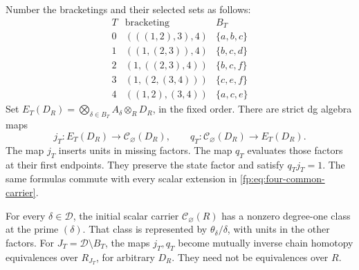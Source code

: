 Number the bracketings and their selected sets as follows:
\begin{equation}\label{fp:eq:four-tree-sets}
\begin{array}{c|c|c}
 T&\text{bracketing}&B_T\\\hline
 0&(((1,2),3),4)&\{a,b,c\}\\
 1&((1,(2,3)),4)&\{b,c,d\}\\
 2&(1,((2,3),4))&\{b,c,f\}\\
 3&(1,(2,(3,4)))&\{c,e,f\}\\
 4&((1,2),(3,4))&\{a,c,e\}
\end{array}
\end{equation}
Set \(E_T(D_R)=\bigotimes_{\delta\in B_T}A_\delta
\otimes_R D_R\), in the fixed order.
There are strict dg algebra maps
\[
 j_T:E_T(D_R)\longrightarrow\mathcal C_\varnothing(D_R),
 \qquad
 q_T:\mathcal C_\varnothing(D_R)\longrightarrow E_T(D_R).
\]
The map \(j_T\) inserts units in missing factors.  The map
\(q_T\) evaluates those factors at their first endpoints.
They preserve the state factor and satisfy \(q_Tj_T=1\).
The same formulas commute with every scalar extension in
\eqref{fp:eq:four-common-carrier}.

\begin{proposition}
\label{fp:prop:four-full-carrier}
For every \(\delta\in\mathcal D\), the initial scalar carrier
\(\mathcal C_\varnothing(R)\) has a nonzero degree-one class
at the prime \((\delta)\).  That class is represented by
\(\theta_\delta/\delta\), with units in the other factors.
For \(J_T=\mathcal D\setminus B_T\), the maps \(j_T,q_T\)
become mutually inverse chain homotopy equivalences over \(R_{J_T}\),
for arbitrary \(D_R\).  They need not be equivalences over \(R\).
\end{proposition}

